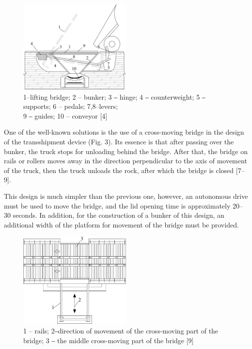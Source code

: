 \begin{figure}[H]
	\centering
	\includegraphics[width=0.5\textwidth]{assets/1351}
	\caption*{Figure 2 -- Device for unloading trucks into a bunker with hinged and lever bridge lifting:}
	\caption*{1--lifting bridge; 2 -- bunker; 3 ‒ hinge; 4 ‒ counterweight; 5 ‒ supports; 6 -- pedals; 7,8--levers;\\ 9 ‒ guides; 10 -- conveyor {[}4{]}}
\end{figure}

\begin{multicols}{2}
One of the well-known solutions is the use of a cross-moving bridge in
the design of the transshipment device (Fig. 3). Its essence is that
after passing over the bunker, the truck stops for unloading behind the
bridge. After that, the bridge on rails or rollers moves away in the
direction perpendicular to the axis of movement of the truck, then the
truck unloads the rock, after which the bridge is closed {[}7--9{]}.

This design is much simpler than the previous one, however, an
autonomous drive must be used to move the bridge, and the lid opening
time is approximately 20--30 seconds. In addition, for the construction
of a bunker of this design, an additional width of the platform for
movement of the bridge must be provided.
\end{multicols}

\begin{figure}[H]
	\centering
	\includegraphics[width=0.5\textwidth]{assets/1352}
	\caption*{Figure 3 -- Device for unloading trucks into a bunker with a cross-moving bridge:}
	\caption*{1 -- rails; 2‒direction of movement of the cross-moving part of the bridge; 3 ‒ the middle cross-moving part of the bridge {[}9{]}}
\end{figure}

